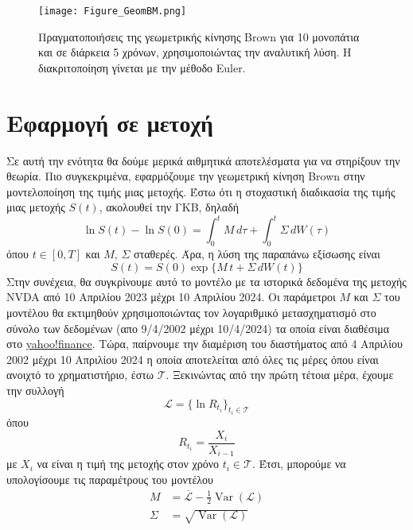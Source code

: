 \documentclass[12pt,a4paper,twoside,openany]{book}
\begin{document}
  	\begin{figure}[h]
  		\centering
  		\texttt{[image: Figure\_GeomBM.png]}
  		\caption{Πραγματοποιήσεις της γεωμετρικής κίνησης Brown για 10 μονοπάτια και σε διάρκεια 5 χρόνων, χρησιμοποιώντας την αναλυτική λύση. Η διακριτοποίηση γίνεται με την μέθοδο Euler.}
  		\label{fig:GBM}
  		\vspace{4mm}
  	\end{figure}
  	


\section{Εφαρμογή σε μετοχή}
\vspace{2.5mm}
	Σε αυτή την ενότητα θα δούμε μερικά αιθμητικά αποτελέσματα για να στηρίξουν την θεωρία. Πιο συγκεκριμένα, εφαρμόζουμε την γεωμετρική κίνηση Brown στην μοντελοποίηση της τιμής μιας μετοχής. Έστω ότι η στοχαστική διαδικασία της τιμής μιας μετοχής $S(t)$, ακολουθεί την ΓΚΒ, δηλαδή
	\[\ln S(t)-\ln S(0) = \int_{0}^{t}M \, d\tau + \int_{0}^{t}\Sigma\, dW(\tau)\]
	όπου $t\in [0,T]$ και $M,\, \Sigma$ σταθερές. Άρα, η λύση της παραπάνω εξίσωσης είναι
	\[S(t) = S(0)\exp\{M\, t + \Sigma\, dW(t)\}\] 
	Στην συνέχεια, θα συγκρίνουμε αυτό το μοντέλο με τα ιστορικά δεδομένα της μετοχής NVDA από 10 Απριλίου 2023 μέχρι 10 Απριλίου 2024. Οι παράμετροι $M$ και $\Sigma$ του μοντέλου θα εκτιμηθούν χρησιμοποιώντας τον λογαριθμικό μετασχηματισμό στο σύνολο των δεδομένων (απο 9/4/2002 μέχρι 10/4/2024) τα οποία είναι διαθέσιμα στο \href{https://finance.yahoo.com/quote/NVDA/history}{yahoo!finance}. Τώρα, παίρνουμε την διαμέριση του διαστήματος από 4 Απριλίου 2002 μέχρι 10 Απριλίου 2024 η οποία αποτελείται από όλες τις μέρες όπου είναι ανοιχτό το χρηματιστήριο, έστω $\mathcal{T}$. Ξεκινώντας από την πρώτη τέτοια μέρα, έχουμε την συλλογή
	\[\mathcal{L} = \{\ln R_{t_i} \}_{t_i\in\mathcal{T}}\]
	όπου
	\[R_{t_i} = \frac{X_i}{X_{i-1}}\]
	με $X_i$ να είναι η τιμή της μετοχής στον χρόνο $t_i\in\mathcal{T}$. Έτσι, μπορούμε να υπολογίσουμε τις παραμέτρους του μοντέλου
	\begin{align*}
		M &= \overline{\mathcal{L}} - \frac{1}{2}\operatorname{Var}(\mathcal{L}) \\
		\Sigma &= \sqrt{\operatorname{Var}(\mathcal{L})}
	\end{align*}
\end{document}
